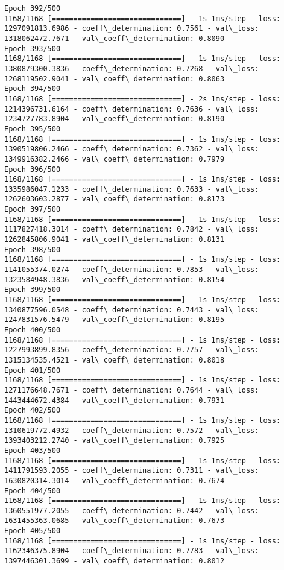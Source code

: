 \documentclass[11pt]{article}
\begin{document}
\begin{Verbatim}[commandchars=\\\{\}]
Epoch 392/500
1168/1168 [==============================] - 1s 1ms/step - loss: 1297091813.6986 - coeff\_determination: 0.7561 - val\_loss: 1318062472.7671 - val\_coeff\_determination: 0.8090
Epoch 393/500
1168/1168 [==============================] - 1s 1ms/step - loss: 1380879300.3836 - coeff\_determination: 0.7268 - val\_loss: 1268119502.9041 - val\_coeff\_determination: 0.8063
Epoch 394/500
1168/1168 [==============================] - 2s 1ms/step - loss: 1214396731.6164 - coeff\_determination: 0.7636 - val\_loss: 1234727783.8904 - val\_coeff\_determination: 0.8190
Epoch 395/500
1168/1168 [==============================] - 1s 1ms/step - loss: 1390519806.2466 - coeff\_determination: 0.7362 - val\_loss: 1349916382.2466 - val\_coeff\_determination: 0.7979
Epoch 396/500
1168/1168 [==============================] - 1s 1ms/step - loss: 1335986047.1233 - coeff\_determination: 0.7633 - val\_loss: 1262603603.2877 - val\_coeff\_determination: 0.8173
Epoch 397/500
1168/1168 [==============================] - 1s 1ms/step - loss: 1117827418.3014 - coeff\_determination: 0.7842 - val\_loss: 1262845806.9041 - val\_coeff\_determination: 0.8131
Epoch 398/500
1168/1168 [==============================] - 1s 1ms/step - loss: 1141055374.0274 - coeff\_determination: 0.7853 - val\_loss: 1323584948.3836 - val\_coeff\_determination: 0.8154
Epoch 399/500
1168/1168 [==============================] - 1s 1ms/step - loss: 1340877596.0548 - coeff\_determination: 0.7443 - val\_loss: 1247831576.5479 - val\_coeff\_determination: 0.8195
Epoch 400/500
1168/1168 [==============================] - 1s 1ms/step - loss: 1227993899.8356 - coeff\_determination: 0.7757 - val\_loss: 1315134535.4521 - val\_coeff\_determination: 0.8018
Epoch 401/500
1168/1168 [==============================] - 1s 1ms/step - loss: 1271176648.7671 - coeff\_determination: 0.7644 - val\_loss: 1443444672.4384 - val\_coeff\_determination: 0.7931
Epoch 402/500
1168/1168 [==============================] - 1s 1ms/step - loss: 1310619772.4932 - coeff\_determination: 0.7572 - val\_loss: 1393403212.2740 - val\_coeff\_determination: 0.7925
Epoch 403/500
1168/1168 [==============================] - 1s 1ms/step - loss: 1411791593.2055 - coeff\_determination: 0.7311 - val\_loss: 1630820314.3014 - val\_coeff\_determination: 0.7674
Epoch 404/500
1168/1168 [==============================] - 1s 1ms/step - loss: 1360551977.2055 - coeff\_determination: 0.7442 - val\_loss: 1631455363.0685 - val\_coeff\_determination: 0.7673
Epoch 405/500
1168/1168 [==============================] - 1s 1ms/step - loss: 1162346375.8904 - coeff\_determination: 0.7783 - val\_loss: 1397446301.3699 - val\_coeff\_determination: 0.8012

\end{Verbatim}
\end{document}
